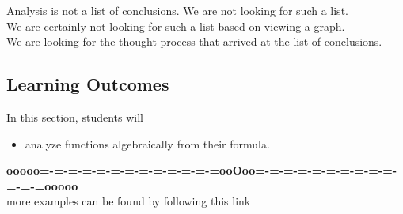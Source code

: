 \documentclass{ximera}
\begin{document}
Analysis is not a list of conclusions. We are not looking for such a list. \\

We are certainly not looking for such a list based on viewing a graph. \\

We are looking for the thought process that arrived at the list of conclusions. \\





\subsection{Learning Outcomes}


\begin{sectionOutcomes}
In this section, students will 

\begin{itemize}
\item analyze functions algebraically from their formula.
\end{itemize}
\end{sectionOutcomes}


















\begin{center}
\textbf{\textcolor{green!50!black}{ooooo=-=-=-=-=-=-=-=-=-=-=-=-=ooOoo=-=-=-=-=-=-=-=-=-=-=-=-=ooooo}} \\

more examples can be found by following this link\\ 

\end{center}
\end{document}
